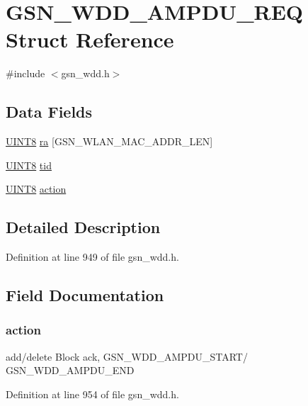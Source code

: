 \hypertarget{a00269}{
\section{GSN\_\-WDD\_\-AMPDU\_\-REQ Struct Reference}
\label{a00269}
}


{\ttfamily \#include $<$gsn\_\-wdd.h$>$}

\subsection*{Data Fields}
\begin{DoxyCompactItemize}
\item 
\hyperlink{a00660_gab27e9918b538ce9d8ca692479b375b6a}{UINT8} \hyperlink{a00269_a1d97eb2e070b4a95218b41f6abbff9d7}{ra} \mbox{[}GSN\_\-WLAN\_\-MAC\_\-ADDR\_\-LEN\mbox{]}
\item 
\hyperlink{a00660_gab27e9918b538ce9d8ca692479b375b6a}{UINT8} \hyperlink{a00269_abf69ed815c8482f9995e41bc0aff9043}{tid}
\item 
\hyperlink{a00660_gab27e9918b538ce9d8ca692479b375b6a}{UINT8} \hyperlink{a00269_ac1731c03e4e0dbe0c25f3a606a77df7e}{action}
\end{DoxyCompactItemize}


\subsection{Detailed Description}


Definition at line 949 of file gsn\_\-wdd.h.



\subsection{Field Documentation}
\hypertarget{a00269_ac1731c03e4e0dbe0c25f3a606a77df7e}{
\subsubsection[{action}]{ {\bf action}}}
\label{a00269_ac1731c03e4e0dbe0c25f3a606a77df7e}
add/delete Block ack, GSN\_\-WDD\_\-AMPDU\_\-START/ GSN\_\-WDD\_\-AMPDU\_\-END 

Definition at line 954 of file gsn\_\-wdd.h.

